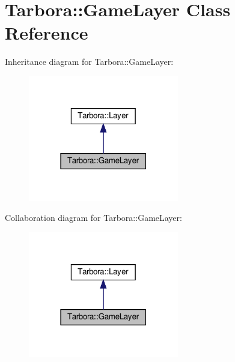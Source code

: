 \hypertarget{classTarbora_1_1GameLayer}{}\section{Tarbora\+:\+:Game\+Layer Class Reference}
\label{classTarbora_1_1GameLayer}


Inheritance diagram for Tarbora\+:\+:Game\+Layer\+:\nopagebreak
\begin{figure}[H]
\begin{center}
\leavevmode
\includegraphics[width=186pt]{classTarbora_1_1GameLayer__inherit__graph}
\end{center}
\end{figure}


Collaboration diagram for Tarbora\+:\+:Game\+Layer\+:\nopagebreak
\begin{figure}[H]
\begin{center}
\leavevmode
\includegraphics[width=186pt]{classTarbora_1_1GameLayer__coll__graph}
\end{center}
\end{figure}
